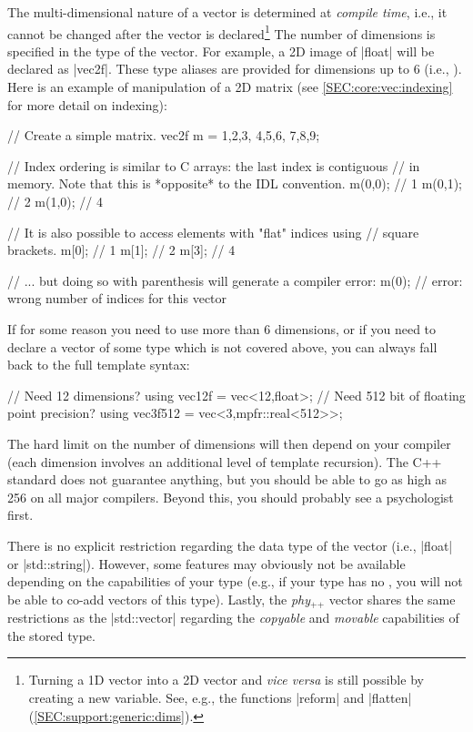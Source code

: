 \documentclass[12pt,a4paper]{report}
\newcommand{\phypp}{\textit{phy}$_{\text{++}}$\xspace}
\newcommand{\stdvec}{\cppinline|std::vector|\xspace}
\newenvironment{advanced}
{
    \begin{mdframed}[style=advanced,frametitle={Advanced}]
}
{
    \end{mdframed}
}
\begin{document}
The multi-dimensional nature of a vector is determined at \emph{compile time}, i.e., it cannot be changed after the vector is declared\footnote{Turning a 1D vector into a 2D vector and {\it vice versa} is still possible by creating a new variable. See, e.g., the functions \cppinline|reform| and \cppinline|flatten| (\ref{SEC:support:generic:dims}).} The number of dimensions is specified in the type of the vector. For example, a 2D image of \cppinline|float| will be declared as \cppinline|vec2f|. These type aliases are provided for dimensions up to $6$ (i.e., ). Here is an example of manipulation of a 2D matrix (see \ref{SEC:core:vec:indexing} for more detail on indexing):

\begin{cppcode}
// Create a simple matrix.
vec2f m = {{1,2,3}, {4,5,6}, {7,8,9}};

// Index ordering is similar to C arrays: the last index is contiguous
// in memory. Note that this is *opposite* to the IDL convention.
m(0,0); // 1
m(0,1); // 2
m(1,0); // 4

// It is also possible to access elements with "flat" indices using
// square brackets.
m[0]; // 1
m[1]; // 2
m[3]; // 4

// ... but doing so with parenthesis will generate a compiler error:
m(0); // error: wrong number of indices for this vector
\end{cppcode}

\begin{advanced}
If for some reason you need to use more than 6 dimensions, or if you need to declare a vector of some type which is not covered above, you can always fall back to the full template syntax:
\begin{cppcode}
// Need 12 dimensions?
using vec12f = vec<12,float>;
// Need 512 bit of floating point precision?
using vec3f512 = vec<3,mpfr::real<512>>;
\end{cppcode}

The hard limit on the number of dimensions will then depend on your compiler (each dimension involves an additional level of template recursion). The C++ standard does not guarantee anything, but you should be able to go as high as 256 on all major compilers. Beyond this, you should probably see a psychologist first.

There is no explicit restriction regarding the data type of the vector (i.e., \cppinline|float| or \cppinline|std::string|). However, some features may obviously not be available depending on the capabilities of your type (e.g., if your type has no , you will not be able to co-add vectors of this type). Lastly, the \phypp vector shares the same restrictions as the \stdvec regarding the \emph{copyable} and \emph{movable} capabilities of the stored type.
\end{advanced}
\end{document}
